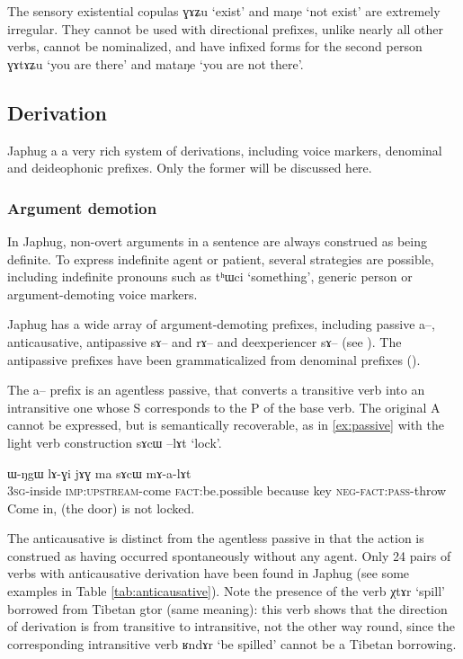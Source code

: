 \documentclass[oldfontcommands,oneside,a4paper,11pt]{article}
\newcommand{\ipa}[1]{{\phon #1}} %
\begin{document}
The sensory existential copulas \ipa{ɣɤʑu} `exist' and \ipa{maŋe} `not exist' are extremely irregular. They cannot be used with directional prefixes, unlike nearly all other verbs, cannot be nominalized, and have infixed forms for the second person \ipa{ɣɤtɤʑu} `you are there' and \ipa{mataŋe} `you are not there'.

\subsection{Derivation}
Japhug a a very rich system of derivations, including voice markers, denominal and deideophonic prefixes. Only the former will be discussed here.

\subsubsection{Argument demotion}
In Japhug, non-overt arguments in a sentence are always construed as being definite. To express indefinite agent or patient, several strategies are possible, including indefinite pronouns such as \ipa{tʰɯci} `something', generic person or argument-demoting voice markers.

Japhug has a wide array of argument-demoting prefixes, including passive \ipa{a--}, anticausative, antipassive \ipa{sɤ--} and \ipa{rɤ--} and deexperiencer \ipa{sɤ--} (see \citealt{jacques12demotion}). The antipassive prefixes have been grammaticalized from denominal prefixes (\citealt{jacques14antipassive}).

The  \ipa{a--} prefix is an agentless passive, that converts a transitive verb into an intransitive one whose S corresponds to the P of the base verb. The original A cannot be expressed, but is semantically recoverable, as in \ref{ex:passive} with the light verb construction \ipa{sɤcɯ --lɤt} `lock'. 

\begin{exe}
\ex \label{ex:passive}
\gll 
\ipa{ɯ-ŋgɯ} 	\ipa{lɤ-ɣi} 	\ipa{jɤɣ} 	\ipa{ma} 	\ipa{sɤcɯ} 	\ipa{mɤ-a-lɤt} \\
\textsc{3sg}-inside \textsc{imp:upstream}-come \textsc{fact}:be.possible because key \textsc{neg-fact:pass}-throw \\
\glt Come in, (the door) is not locked.
\end{exe}

The anticausative is distinct from the agentless passive in that the action is construed as having occurred spontaneously without any agent. Only 24 pairs of verbs with anticausative derivation have been found in Japhug (see some examples in Table \ref{tab:anticausative}). Note the presence of the verb \ipa{χtɤr} `spill' borrowed from Tibetan \ipa{gtor} (same meaning): this verb shows that the direction of derivation is from transitive to intransitive, not the other way round, since the corresponding intransitive verb \ipa{ʁndɤr} `be spilled' cannot be a Tibetan borrowing.
\end{document}
